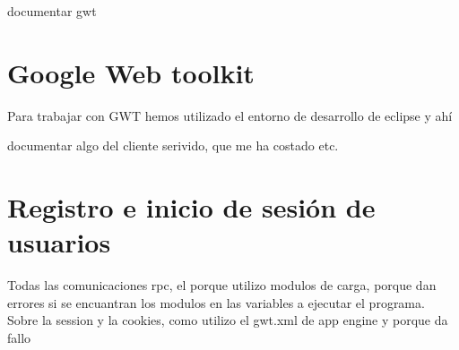 documentar gwt
\section{Google Web toolkit}
Para trabajar con GWT hemos utilizado el entorno de desarrollo de eclipse y ahí 
 
 
 documentar algo del cliente serivido, que me ha costado etc.



\section{Registro e inicio de sesión de usuarios}
Todas las comunicaciones rpc, el porque utilizo modulos de carga, porque dan errores si se encuantran los modulos en las variables a ejecutar el programa.
Sobre la session y la cookies, como utilizo el gwt.xml de app engine y porque da fallo
